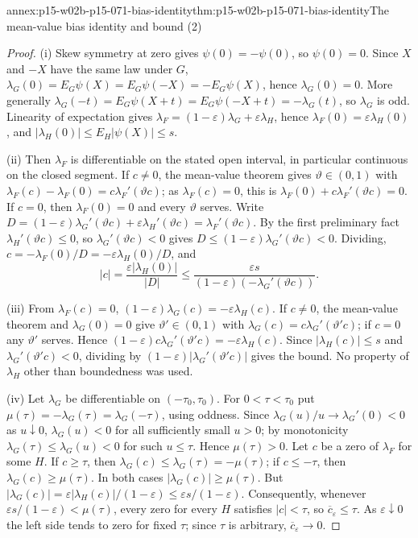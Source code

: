\begin{annexitem}{annex:p15-w02b-p15-071-bias-identity}{thm:p15-w02b-p15-071-bias-identity}{The mean-value bias identity and bound (2)}
\begin{proof}
(i) Skew symmetry at zero gives \(\psi(0)=-\psi(0)\), so
\(\psi(0)=0\). Since \(X\) and \(-X\) have the same law under \(G\),
\(\lambda_G(0)=E_G\psi(X)=E_G\psi(-X)=-E_G\psi(X)\), hence
\(\lambda_G(0)=0\). More generally
\(\lambda_G(-t)=E_G\psi(X+t)=E_G\psi(-X+t)=-\lambda_G(t)\), so
\(\lambda_G\) is odd. Linearity of expectation gives
\(\lambda_F=(1-\varepsilon)\lambda_G+\varepsilon\lambda_H\), hence
\(\lambda_F(0)=\varepsilon\lambda_H(0)\), and
\(|\lambda_H(0)|\leq E_H|\psi(X)|\leq s\).

(ii) Then \(\lambda_F\) is differentiable on the stated open interval,
in particular continuous on the closed segment. If \(c\neq0\), the
mean-value theorem gives \(\vartheta\in(0,1)\) with
\(\lambda_F(c)-\lambda_F(0)=c\lambda_F'(\vartheta c)\); as
\(\lambda_F(c)=0\), this is \(\lambda_F(0)+c\lambda_F'(\vartheta c)=0\).
If \(c=0\), then \(\lambda_F(0)=0\) and every \(\vartheta\) serves.
Write \(D=(1-\varepsilon)\lambda_G'(\vartheta c)
+\varepsilon\lambda_H'(\vartheta c)=\lambda_F'(\vartheta c)\).
By the first preliminary fact \(\lambda_H'(\vartheta c)\leq0\), so
\(\lambda_G'(\vartheta c)<0\) gives
\(D\leq(1-\varepsilon)\lambda_G'(\vartheta c)<0\).
Dividing, \(c=-\lambda_F(0)/D=-\varepsilon\lambda_H(0)/D\), and
\[
 |c|=\frac{\varepsilon|\lambda_H(0)|}{|D|}\leq
 \frac{\varepsilon s}{(1-\varepsilon)(-\lambda_G'(\vartheta c))}.
\]

(iii) From \(\lambda_F(c)=0\),
\((1-\varepsilon)\lambda_G(c)=-\varepsilon\lambda_H(c)\).
If \(c\neq0\), the mean-value theorem and \(\lambda_G(0)=0\) give
\(\vartheta'\in(0,1)\) with \(\lambda_G(c)=c\lambda_G'(\vartheta'c)\);
if \(c=0\) any \(\vartheta'\) serves. Hence
\((1-\varepsilon)c\lambda_G'(\vartheta'c)=-\varepsilon\lambda_H(c)\).
Since \(|\lambda_H(c)|\leq s\) and \(\lambda_G'(\vartheta'c)<0\),
dividing by \((1-\varepsilon)|\lambda_G'(\vartheta'c)|\) gives the bound.
No property of \(\lambda_H\) other than boundedness was used.

(iv) Let \(\lambda_G\) be differentiable on \((-\tau_0,\tau_0)\).
For \(0<\tau<\tau_0\) put \(\mu(\tau)=-\lambda_G(\tau)=\lambda_G(-\tau)\),
using oddness. Since \(\lambda_G(u)/u\to\lambda_G'(0)<0\) as
\(u\downarrow0\), \(\lambda_G(u)<0\) for all sufficiently small \(u>0\);
by monotonicity \(\lambda_G(\tau)\leq\lambda_G(u)<0\) for such \(u\leq\tau\).
Hence \(\mu(\tau)>0\).
Let \(c\) be a zero of \(\lambda_F\) for some \(H\). If \(c\geq\tau\),
then \(\lambda_G(c)\leq\lambda_G(\tau)=-\mu(\tau)\); if \(c\leq-\tau\),
then \(\lambda_G(c)\geq\mu(\tau)\). In both cases
\(|\lambda_G(c)|\geq\mu(\tau)\). But
\(|\lambda_G(c)|=\varepsilon|\lambda_H(c)|/(1-\varepsilon)
\leq\varepsilon s/(1-\varepsilon)\). Consequently, whenever
\(\varepsilon s/(1-\varepsilon)<\mu(\tau)\), every zero for every \(H\)
satisfies \(|c|<\tau\), so \(\overline c_\varepsilon\leq\tau\).
As \(\varepsilon\downarrow0\) the left side tends to zero for fixed
\(\tau\); since \(\tau\) is arbitrary, \(\overline c_\varepsilon\to0\).


\end{proof}
\end{annexitem}
